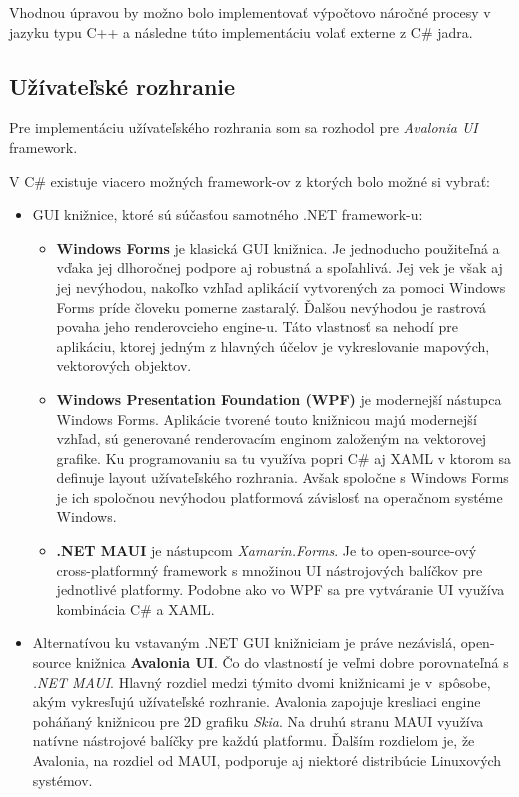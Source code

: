 Vhodnou úpravou by možno bolo implementovať výpočtovo náročné procesy v jazyku typu C++ a následne túto implementáciu volať externe z C\# jadra.     

\subsection{Užívateľské rozhranie}

Pre implementáciu užívateľského rozhrania som sa rozhodol pre \textit{Avalonia UI} framework. 

V C\# existuje viacero možných framework-ov z ktorých bolo možné si vybrať:
\begin{itemize}
    \item GUI knižnice, ktoré sú súčasťou samotného .NET framework-u:
    \begin{itemize}
        \item \textbf{Windows Forms} je klasická GUI knižnica. Je jednoducho použiteľná a vďaka jej dlhoročnej podpore aj robustná a spoľahlivá. Jej vek je však aj jej nevýhodou, nakoľko vzhľad aplikácií vytvorených za pomoci Windows Forms príde človeku pomerne zastaralý. Ďalšou nevýhodou je rastrová povaha jeho renderovcieho engine-u. Táto vlastnosť sa nehodí pre aplikáciu, ktorej jedným z hlavných účelov je vykreslovanie mapových, vektorových objektov.     
        \item \textbf{Windows Presentation Foundation (WPF)} je modernejší nástupca Windows Forms. Aplikácie tvorené touto knižnicou majú modernejší vzhľad, sú generované renderovacím enginom založeným na vektorovej grafike. Ku programovaniu sa tu využíva popri C\# aj XAML v ktorom sa definuje layout užívateľského rozhrania. Avšak spoločne s Windows Forms je ich spoločnou nevýhodou platformová závislosť na operačnom systéme Windows.
        \item \textbf{.NET MAUI} je nástupcom \textit{Xamarin.Forms}. Je to open-source-ový cross-platformný framework s množinou UI nástrojových balíčkov pre jednotlivé platformy. Podobne ako vo WPF sa pre vytváranie UI využíva kombinácia C\# a XAML. 
    \end{itemize}
    \item Alternatívou ku vstavaným .NET GUI knižniciam je práve nezávislá, open-source knižnica \textbf{Avalonia UI}. Čo do vlastností je veľmi dobre porovnateľná s \textit{.NET MAUI}. Hlavný rozdiel medzi týmito dvomi knižnicami je v~spôsobe, akým vykresľujú užívateľské rozhranie. Avalonia zapojuje kresliaci engine poháňaný knižnicou pre 2D grafiku \textit{Skia}. Na druhú stranu MAUI využíva natívne nástrojové balíčky pre každú platformu. Ďalším rozdielom je, že Avalonia, na rozdiel od MAUI, podporuje aj niektoré distribúcie Linuxových systémov.
\end{itemize}

